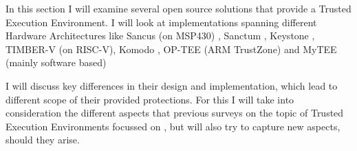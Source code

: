 In this section I will examine several open source solutions that provide a Trusted Execution Environment. I will look at implementations spanning different Hardware Architectures like Sancus (on MSP430) \cite{sancus}, Sanctum \cite{sanctum_paper}, Keystone \cite{keystone_paper}, TIMBER-V \cite{timber-v} (on RISC-V), Komodo \cite{Komodo}, OP-TEE \cite{optee_notrealpaper}(ARM TrustZone) and MyTEE (mainly software based)

I will discuss key differences in their design and implementation, which lead to different scope of their provided protections. For this I will take into consideration the different aspects that previous surveys on the topic of Trusted Execution Environments focussed on \cite{Maene2018} \cite{tee_whatitis}, but will also try to capture new aspects, should they arise.